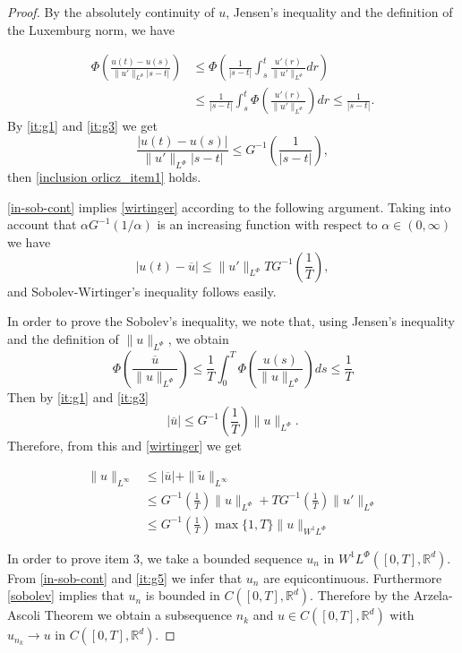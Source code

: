\documentclass[twoside]{article}
\theoremstyle{remark}
\newcommand{\orlnor}{\|_{L^{\Phi}}}
\newcommand{\linf}{\|_{L^{\infty}}}
\newcommand{\lphi}{L^{\Phi}}
\newcommand{\wphi}{W^{1}\lphi}
\newcommand{\sobnor}{\|_{W^{1}\lphi}}
\newcommand{\rr}{\mathbb{R}}
\renewcommand{\leq}{\leqslant}
\begin{document}
\begin{proof} By the absolutely continuity of $u$, Jensen's inequality and the definition of 
the Luxemburg norm, we have

\[
 \begin{split}
    \Phi\left( \frac{u(t)-u(s)}{\|u'\orlnor |s-t|}\right) &\leq  \Phi\left( \frac{1}{ |s-t|}\int_s^t  \frac{u'(r)}{\|u'\orlnor }dr\right)\\
    &\leq   \frac{1}{ |s-t|}\int_s^t  \Phi\left(\frac{u'(r)}{\|u'\orlnor }\right)dr
    \leq \frac{1}{ |s-t|}.
 \end{split}
\]
By  \ref{it:g1} and \ref{it:g3} we get
\[
    \frac{|u(t)-u(s)|}{\|u'\orlnor |s-t|} 
    \leq  G^{-1}\left(\frac{1}{ |s-t|}\right),
\]
then  \ref{inclusion orlicz_item1} holds.

\ref{in-sob-cont}  implies \ref{wirtinger} according to the following argument.  
Taking into account that $\alpha G^{-1}(1/\alpha)$ is an increasing function
with respect to $\alpha\in (0,\infty)$ we have
\[|u(t)-\overline{u}|\leq  \|u'\orlnor T G^{-1}\left(\frac{1}{T}\right),\]
and Sobolev-Wirtinger's inequality follows easily.

In order to prove the Sobolev's inequality, we note that, using Jensen's inequality and 
the definition of $\|u\orlnor$, we obtain
\[ \Phi\left( \frac{ \overline{u}}{\|u\orlnor} \right) \leq
\frac{1}{T}\int_0^T\Phi\left(\frac{u(s)}{\|u\orlnor}\right)ds\leq\frac{1}{T}
\]
Then by  \ref{it:g1} and \ref{it:g3}
\[|\overline{u}|\leq G^{-1}\left(\frac{1}{T}\right) \|u\orlnor.\]
Therefore, from this and \eqref{wirtinger} we get

\[\begin{split}
 \|u\linf &\leq |\overline{u}|+\|\tilde{u}\linf\\
 &\leq  
 G^{-1}\left(\frac{1}{T}\right) \|u\orlnor+T G^{-1}\left(\frac{1}{T}\right)\|u'\orlnor\\
 &\leq G^{-1}\left(\frac{1}{T}\right)\max\{1,T\}\|u\sobnor
 \end{split}
 \]
 



In order to prove item 3, we take a bounded sequence
$u_n$ in $\wphi([0,T],\rr^d)$. From \eqref{in-sob-cont} and \ref{it:g5}  we infer that $u_n$ are equicontinuous. Furthermore \eqref{sobolev} implies that $u_n$ is bounded in $C([0,T],\rr^d)$. Therefore by the Arzela-Ascoli Theorem we  obtain a subsequence $n_k$ and  $u\in C([0,T],\rr^d)$ with $u_{n_k}\to u$ in $C([0,T],\rr^d)$.

\end{proof}
\end{document}
